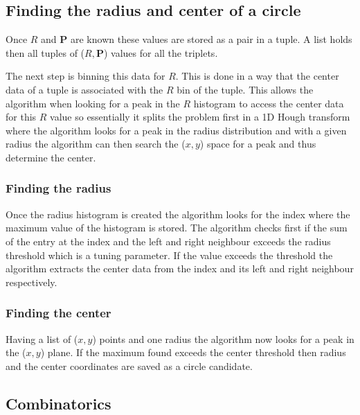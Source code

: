 \documentclass[11pt,twoside]{scrreprt}
\begin{document}
\subsection{Finding the radius and center of a circle} %
\label{sub:finding_the_radius_and_center_of_a_circle}
Once $R$ and $\mathbf{P}$ are known these values are stored as a pair in a tuple. A list holds then all tuples of ($R, \mathbf{P}$) values
for all the triplets.

The next step is binning this data for $R$. This is done in a way that the center data of a tuple is associated with the $R$ bin of the tuple.
This allows the algorithm when looking for a peak in the $R$ histogram to access the center data for this $R$ value so essentially it
splits the problem first in a 1D Hough transform where the algorithm looks for a peak in the radius distribution and with a given radius
the algorithm can then search the ($x,y$) space for a peak and thus determine the center.

\subsubsection{Finding the radius} %
\label{ssub:finding_the_radius}
Once the radius histogram is created the algorithm looks for the index where the maximum value of the histogram is stored. The algorithm
checks first if the sum of the entry at the index and the left and right neighbour exceeds the radius threshold which is a tuning parameter.
If the value exceeds the threshold the algorithm extracts the center data from the index and its left and right neighbour respectively.

\subsubsection{Finding the center} %
\label{ssub:finding_the_center}
Having a list of ($x,y$) points and one radius the algorithm now looks for a peak in the ($x,y$) plane. If the maximum found exceeds the
center threshold then radius and the center coordinates are saved as a circle candidate.



\subsection{Combinatorics}
	
\end{document}
